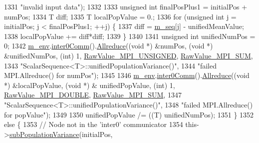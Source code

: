\begin{DoxyCode}
1331                           \textcolor{stringliteral}{"invalid input data"});
1332 
1333       \textcolor{keywordtype}{unsigned} \textcolor{keywordtype}{int} finalPosPlus1 = initialPos + numPos;
1334       T diff;
1335       T localPopValue = 0.;
1336       \textcolor{keywordflow}{for} (\textcolor{keywordtype}{unsigned} \textcolor{keywordtype}{int} j = initialPos; j < finalPosPlus1; ++j) \{
1337         diff = \hyperlink{class_q_u_e_s_o_1_1_scalar_sequence_ae616036fd2e62fb69df167814545e893}{m\_seq}[j] - unifiedMeanValue;
1338         localPopValue += diff*diff;
1339       \}
1340 
1341       \textcolor{keywordtype}{unsigned} \textcolor{keywordtype}{int} unifiedNumPos = 0;
1342       \hyperlink{class_q_u_e_s_o_1_1_scalar_sequence_a71618cd6351b29361b437af68447a4c8}{m\_env}.\hyperlink{class_q_u_e_s_o_1_1_base_environment_a689e4d140c74d495d97eb498714a4b82}{inter0Comm}().\hyperlink{class_q_u_e_s_o_1_1_mpi_comm_a72e137e60ef8060efb1ee5fc874fa4b8}{Allreduce}((\textcolor{keywordtype}{void} *) &numPos, (\textcolor{keywordtype}{void} *) &unifiedNumPos, (\textcolor{keywordtype}{int})
       1, \hyperlink{_mpi_comm_8h_a06cbfbc33436f6e0dc8a48ff3c49bdfc}{RawValue\_MPI\_UNSIGNED}, \hyperlink{_mpi_comm_8h_afbf78d291c032aa7f512bc566cee2bd1}{RawValue\_MPI\_SUM},
1343                                    \textcolor{stringliteral}{"ScalarSequence<T>::unifiedPopulationVariance()"},
1344                                    \textcolor{stringliteral}{"failed MPI.Allreduce() for numPos"});
1345 
1346       \hyperlink{class_q_u_e_s_o_1_1_scalar_sequence_a71618cd6351b29361b437af68447a4c8}{m\_env}.\hyperlink{class_q_u_e_s_o_1_1_base_environment_a689e4d140c74d495d97eb498714a4b82}{inter0Comm}().\hyperlink{class_q_u_e_s_o_1_1_mpi_comm_a72e137e60ef8060efb1ee5fc874fa4b8}{Allreduce}((\textcolor{keywordtype}{void} *) &localPopValue, (\textcolor{keywordtype}{void} *) &
      unifiedPopValue, (\textcolor{keywordtype}{int}) 1, \hyperlink{_mpi_comm_8h_ad0f503bd9fecfe4e570ca3d15aaf2518}{RawValue\_MPI\_DOUBLE}, \hyperlink{_mpi_comm_8h_afbf78d291c032aa7f512bc566cee2bd1}{RawValue\_MPI\_SUM},
1347                                    \textcolor{stringliteral}{"ScalarSequence<T>::unifiedPopulationVariance()"},
1348                                    \textcolor{stringliteral}{"failed MPI.Allreduce() for popValue"});
1349 
1350       unifiedPopValue /= ((T) unifiedNumPos);
1351     \}
1352     \textcolor{keywordflow}{else} \{
1353       \textcolor{comment}{// Node not in the 'inter0' communicator}
1354       this->\hyperlink{class_q_u_e_s_o_1_1_scalar_sequence_a997bf4ce6fc322d71c509f8d622ad538}{subPopulationVariance}(initialPos,

\end{DoxyCode}

